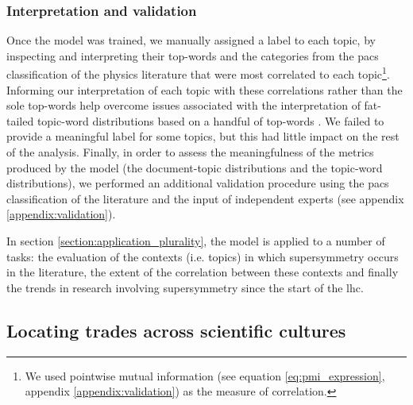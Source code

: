\documentclass[smallextended]{svjour3}
\begin{document}
\subsubsection{Interpretation and validation}

Once the model was trained, we manually assigned a label to each topic, by inspecting and interpreting their top-words and the categories from the \gls{pacs} classification of the physics literature that were most correlated to each topic\footnote{We used pointwise mutual information (see equation \ref{eq:pmi_expression}, appendix \ref{appendix:validation}) as the measure of correlation.}. Informing our interpretation of each topic with these correlations rather than the sole top-words help overcome issues associated with the interpretation of fat-tailed topic-word distributions based on a handful of top-words \citep{Chang2009,Allen2022}.  We failed to provide a meaningful label for some topics, but this had little impact on the rest of the analysis. Finally, in order to assess the meaningfulness of the metrics produced by the model (the document-topic distributions and the topic-word distributions), we performed an additional validation procedure using the \gls{pacs} classification of the literature and the input of independent experts (see appendix \ref{appendix:validation}). 

In section \ref{section:application_plurality}, the model is applied to a number of tasks: the evaluation of the contexts (i.e. topics) in which supersymmetry occurs in the literature, the extent of the correlation between these contexts and finally the trends in research involving supersymmetry since the start of the \gls{lhc}.

\subsection{Locating trades across scientific cultures}\label{section:method_trading_zone}
\end{document}
